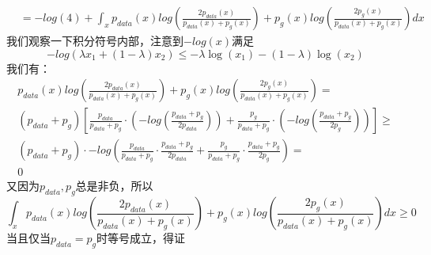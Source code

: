 \documentclass[a4paper, 11pt]{article}
\begin{document}
\begin{CJK}{UTF8}{gbsn}
\[\begin{split}
&=-log(4)+\int_{x}p_{data}(x)log(\frac{2p_{data}(x)}{p_{data}(x)+p_{g}(x)})+p_{g}(x)log(\frac{2p_{g}(x)}{p_{data}(x)+p_{g}(x)})dx
\end{split}
\]
我们观察一下积分符号内部，注意到$-log(x)$满足
\[-log(\lambda x_{1}+(1-\lambda)x_{2})\leq-\lambda\log(x_{1})-(1-\lambda)\log(x_{2})\]
我们有：
\[
\begin{split}
p_{data}(x)log(\frac{2p_{data}(x)}{p_{data}(x)+p_{g}(x)})+p_{g}(x)log(\frac{2p_{g}(x)}{p_{data}(x)+p_{g}(x)})=\\
(p_{data}+p_{g})\left[\frac{p_{data}}{p_{data}+p_{g}}\cdot(-log(\frac{p_{data}+p_{g}}{2p_{data}}))+\frac{p_{g}}{p_{data}+p_{g}}\cdot(-log(\frac{p_{data}+p_{g}}{2p_{g}}))
\right]\geq\\
(p_{data}+p_{g})\cdot-log\left(\frac{p_{data}}{p_{data}+p_{g}}\cdot\frac{p_{data}+p_{g}}{2p_{data}}+\frac{p_{g}}{p_{data}+p_{g}}\cdot\frac{p_{data}+p_{g}}{2p_{g}}\right)=\\
0
\end{split}
\]
又因为$p_{data},p_{g}$总是非负，所以
\[\int_{x}p_{data}(x)log(\frac{2p_{data}(x)}{p_{data}(x)+p_{g}(x)})+p_{g}(x)log(\frac{2p_{g}(x)}{p_{data}(x)+p_{g}(x)})dx \geq0\]
当且仅当$p_{data}=p_{g}$时等号成立，得证

\end{CJK}
\end{document}
